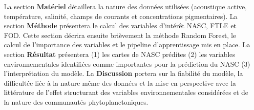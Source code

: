 \vspace{0.3cm}

La section \textbf{Matériel} détaillera la nature des données utilisées (acoustique active, température, salinité, champs de courants et concentrations pigmentaires). La section \textbf{Méthode} présentera le calcul des variables d'intérêt NASC, FTLE et FOD. Cette section décrira ensuite brièvement la méthode Random Forest, le calcul de l'importance des variables et le pipeline d'apprentissage mis en place. La section \textbf{Résultat} présentera (1) les cartes de NASC prédites (2) les variables environnementales identifiées comme importantes pour la prédiction du NASC (3) l'interprétation du modèle. La \textbf{Discussion }portera sur la fiabilité du modèle, la difficultée liée à la nature même des données et la mise en perspective avec la littérature de l'effet structurant des variables environnementales considérées et de la nature des communautés phytoplanctoniques.
